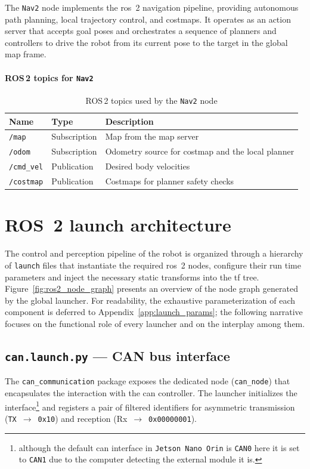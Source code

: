 The \texttt{Nav2} node implements the \gls{ros}~2 navigation pipeline, providing autonomous path planning, local trajectory control, and \glspl{costmap}. It operates as an action server that accepts goal poses and orchestrates a sequence of planners and controllers to drive the robot from its current pose to the target in the global map frame.

\paragraph*{ROS\,2 topics for \texttt{Nav2}}
\begin{table}[H]
  \centering
  \begin{tabular}{lll}
    \toprule
    \textbf{Name}      & \textbf{Type} & \textbf{Description}                              \\
    \midrule
    \texttt{/map}      & Subscription  & Map from the map server                           \\
    \texttt{/odom}     & Subscription  & Odometry source for costmap and the local planner \\
    \texttt{/cmd\_vel} & Publication   & Desired body velocities                           \\
    \texttt{/costmap}  & Publication   & Costmaps for planner safety checks                \\
    \bottomrule
  \end{tabular}
  \caption{ROS\,2 topics used by the \texttt{Nav2} node}
  \label{tab:nav2-topics}
\end{table}

\section{ROS~2 launch architecture}\label{sec:ros2_launch_architecture}

The control and perception pipeline of the robot is organized through a hierarchy of \texttt{launch} files that instantiate the required \gls{ros}~2 nodes, configure their run time parameters and inject the necessary static transforms into the \gls{tf} tree. Figure~\ref{fig:ros2_node_graph} presents an overview of the node graph generated by the global launcher. For readability, the exhaustive parameterization of each component is deferred to Appendix~\ref{app:launch_params}; the following narrative focuses on the functional role of every launcher and on the interplay among them.

\subsection*{\texttt{can.launch.py} --- CAN bus interface}
The \texttt{can\_communication} package exposes the dedicated node (\texttt{can\_node}) that encapsulates the interaction with the \gls{can} controller. The launcher initializes the interface\footnote{although the default can interface in \texttt{Jetson Nano Orin} is \texttt{CAN0} here it is set to \texttt{CAN1} due to the computer detecting the external module it is.} and registers a pair of filtered identifiers for asymmetric transmission (\texttt{TX}~$\rightarrow$~\texttt{0x10}) and reception (Rx~$\rightarrow$~\texttt{0x00000001}).

